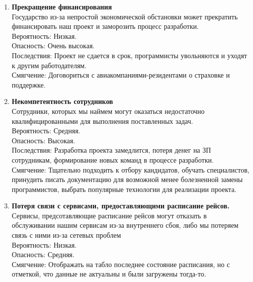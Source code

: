 
\begin{enumerate}
      \item \textbf{Прекращение финансирования} \\
            Государство из-за непростой экономической обстановки может 
            прекратить финансировать наш проект и заморозить процесс разработки. \\
            Вероятность: Низкая. \\
            Опасность: Очень высокая. \\
            Последствия: Проект не сдается в срок, программисты увольняются и уходят 
            к другим работодателям. \\
            Смягчение: Договориться с авиакомпаниями-резидентами о страховке и поддержке.

      \item \textbf{Некомпетентность сотрудников} \\
            Сотрудники, которых мы наймем могут оказаться недостаточно 
            квалифицированными для выполнения поставленных задач. \\
            Вероятность: Средняя. \\
            Опасность: Высокая. \\
            Последствия: Разработка проекта замедлится, потеря денег на ЗП
            сотрудникам, формирование новых команд в процессе разработки. \\
            Смягчение: Тщательно подходить к отбору кандидатов, обучать 
            специалистов, принудить писать документацию для возможной менее
            болезненной замены программистов, выбрать популярные технологии
            для реализации проекта.

      \item \textbf{Потеря связи с сервисами, предоставляющими расписание рейсов.} \\
            Сервисы, предсотавляющие расписание рейсов могут отказать
            в обслуживании нашим сервисам из-за внутреннего сбоя,
            либо мы потеряем связь с ними из-за сетевых проблем \\
            Вероятность: Низкая. \\
            Опасность: Средняя. \\
            Смягчение: Отображать на табло последнее состояние расписания, но с
            отметкой, что данные не актуальны и были загружены тогда-то.


\end{enumerate}
